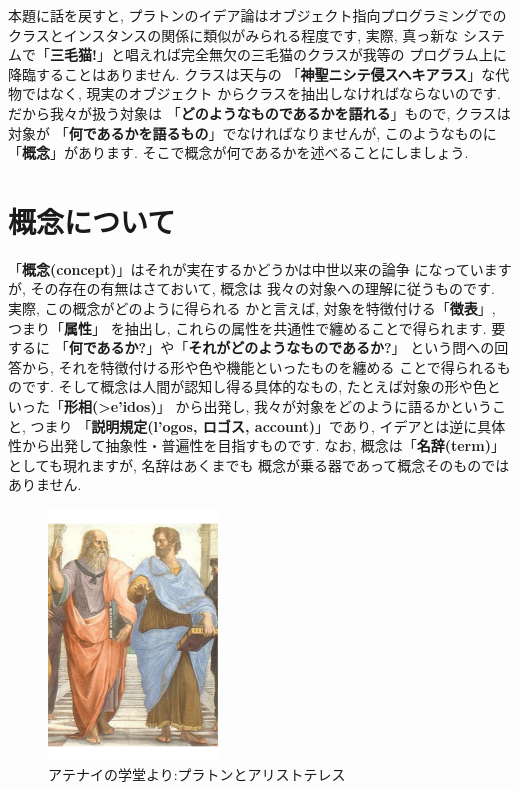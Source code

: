 本題に話を戻すと, プラトンのイデア論はオブジェクト指向プログラミングでの
クラスとインスタンスの関係に類似がみられる程度です, 実際, 真っ新な
システムで「\textbf{三毛猫!}」と唱えれば完全無欠の三毛猫のクラスが我等の
プログラム上に降臨することはありません. クラスは天与の
「\textbf{神聖ニシテ侵スヘキアラス}」な代物ではなく, 現実のオブジェクト
からクラスを抽出しなければならないのです. だから我々が扱う対象は
「\textbf{どのようなものであるかを語れる}」もので, クラスは対象が
「\textbf{何であるかを語るもの}」でなければなりませんが, このようなものに
「\textbf{概念}」があります. そこで概念が何であるかを述べることにしましょう.


\section{概念について}

「\textbf{概念(concept)}」はそれが実在するかどうかは中世以来の論争
\cite{普遍論争}になっていますが, その存在の有無はさておいて, 概念は
我々の対象への理解に従うものです. 実際, この概念がどのように得られる
かと言えば, 対象を特徴付ける「\textbf{徴表}」, つまり「\textbf{属性}」
を抽出し, これらの属性を共通性で纏めることで得られます. 要するに
「\textbf{何であるか?}」や「\textbf{それがどのようなものであるか?}」
という問への回答から, それを特徴付ける形や色や機能といったものを纏める
ことで得られるものです. そして概念は人間が認知し得る具体的なもの,
 たとえば対象の形や色といった「\textbf{形相(\textgreek{>e'idos})}」
から出発し, 我々が対象をどのように語るかということ, つまり
「\textbf{説明規定(\textgreek{l'ogos}, ロゴス, account)}」であり,
 イデアとは逆に具体性から出発して抽象性・普遍性を目指すものです. なお,
 概念は「\textbf{名辞(term)}」としても現れますが, 名辞はあくまでも
概念が乗る器であって概念そのものではありません.
\newline

\begin{figure}
\includegraphics[width=4.5cm]{Plato_and_Aristotle_in_The_School_of_Athens,_by_italian_Rafael.pdf}
\caption{アテナイの学堂より:プラトンとアリストテレス}
\label{fig:Plato-Aristotle}
\end{figure}

